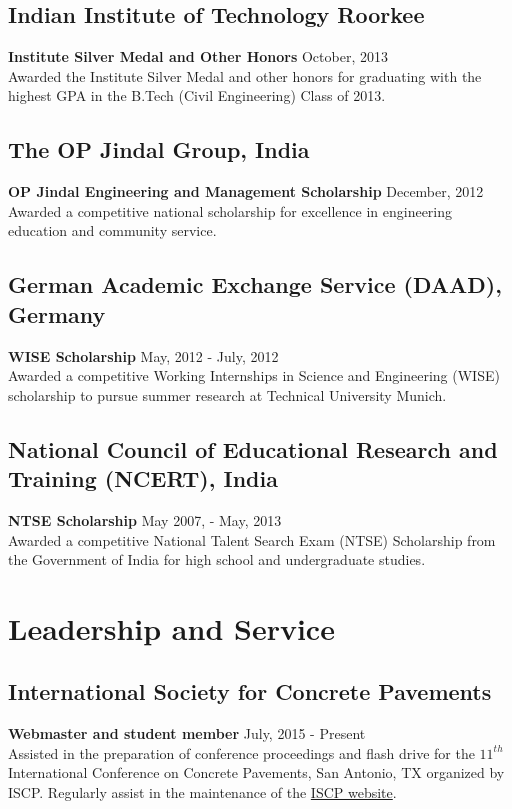 \documentclass[12pt]{article}
\begin{document}
\subsection*{Indian Institute of Technology Roorkee} 
\textbf{Institute Silver Medal and Other Honors} \hfill October, 2013 \\
Awarded the Institute Silver Medal and other honors for graduating with the highest GPA in the B.Tech (Civil Engineering) Class of 2013. \\

\subsection*{The OP Jindal Group, India} 
\textbf{OP Jindal Engineering and Management Scholarship} \hfill December, 2012 \\
Awarded a competitive national scholarship for excellence in engineering education and community service. \\

\subsection*{German Academic Exchange Service (DAAD), Germany} 
\textbf{WISE Scholarship} \hfill May, 2012 - July, 2012 \\
Awarded a competitive Working Internships in Science and Engineering (WISE) scholarship to pursue summer research at Technical University Munich. \\

\subsection*{National Council of Educational Research and Training (NCERT), India} 
\textbf{NTSE Scholarship} \hfill May 2007, - May, 2013 \\
Awarded a competitive National Talent Search Exam (NTSE) Scholarship from the Government of India for high school and undergraduate studies. \\

\section*{Leadership and Service}
\subsection*{International Society for Concrete Pavements}
\textbf{Webmaster and student member} \hfill July, 2015 - Present \\
Assisted in the preparation of conference proceedings and flash drive for the $11^{th}$ International Conference on Concrete Pavements, San Antonio, TX organized by ISCP. Regularly assist in the maintenance of the \href{concretepavements.org}{ISCP website}. \\
\end{document}
